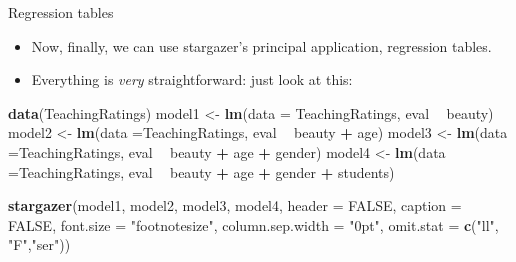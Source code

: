 \documentclass[
  10pt,
  ignorenonframetext,
]{beamer}
\newenvironment{Shaded}{\begin{snugshade}}{\end{snugshade}}
\newcommand{\DataTypeTok}[1]{\textcolor[rgb]{0.13,0.29,0.53}{#1}}
\newcommand{\KeywordTok}[1]{\textcolor[rgb]{0.13,0.29,0.53}{\textbf{#1}}}
\newcommand{\NormalTok}[1]{#1}
\newcommand{\OperatorTok}[1]{\textcolor[rgb]{0.81,0.36,0.00}{\textbf{#1}}}
\newcommand{\OtherTok}[1]{\textcolor[rgb]{0.56,0.35,0.01}{#1}}
\newcommand{\StringTok}[1]{\textcolor[rgb]{0.31,0.60,0.02}{#1}}
\begin{document}
\begin{frame}[fragile]{Regression tables}
\protect\hypertarget{regression-tables}{}

\begin{itemize}
\item
  Now, finally, we can use stargazer's principal application, regression
  tables.
\item
  Everything is \emph{very} straightforward: just look at this:
  \footnotesize
\end{itemize}

\begin{Shaded}
\begin{Highlighting}[]
\KeywordTok{data}\NormalTok{(TeachingRatings) }
\NormalTok{model1 <-}\StringTok{ }\KeywordTok{lm}\NormalTok{(}\DataTypeTok{data =}\NormalTok{ TeachingRatings, }
\NormalTok{             eval }\OperatorTok{~}\StringTok{ }\NormalTok{beauty)}
\NormalTok{model2 <-}\StringTok{ }\KeywordTok{lm}\NormalTok{(}\DataTypeTok{data =}\NormalTok{TeachingRatings, }
\NormalTok{             eval }\OperatorTok{~}\StringTok{ }\NormalTok{beauty }\OperatorTok{+}\StringTok{ }\NormalTok{age)}
\NormalTok{model3 <-}\StringTok{ }\KeywordTok{lm}\NormalTok{(}\DataTypeTok{data =}\NormalTok{TeachingRatings, }
\NormalTok{             eval }\OperatorTok{~}\StringTok{ }\NormalTok{beauty }\OperatorTok{+}\StringTok{ }\NormalTok{age }\OperatorTok{+}\StringTok{ }\NormalTok{gender)}
\NormalTok{model4 <-}\StringTok{ }\KeywordTok{lm}\NormalTok{(}\DataTypeTok{data =}\NormalTok{TeachingRatings, }
\NormalTok{             eval }\OperatorTok{~}\StringTok{ }\NormalTok{beauty }\OperatorTok{+}\StringTok{ }\NormalTok{age }\OperatorTok{+}\StringTok{ }\NormalTok{gender }\OperatorTok{+}\StringTok{ }\NormalTok{students)}

\KeywordTok{stargazer}\NormalTok{(model1, model2, model3, model4,}
          \DataTypeTok{header =} \OtherTok{FALSE}\NormalTok{,}
          \DataTypeTok{caption =} \OtherTok{FALSE}\NormalTok{,}
          \DataTypeTok{font.size =} \StringTok{"footnotesize"}\NormalTok{,}
          \DataTypeTok{column.sep.width =} \StringTok{"0pt"}\NormalTok{,}
          \DataTypeTok{omit.stat =} \KeywordTok{c}\NormalTok{(}\StringTok{"ll"}\NormalTok{, }\StringTok{"F"}\NormalTok{,}\StringTok{"ser"}\NormalTok{))}
\end{Highlighting}
\end{Shaded}

\normalsize

\end{frame}
\end{document}
